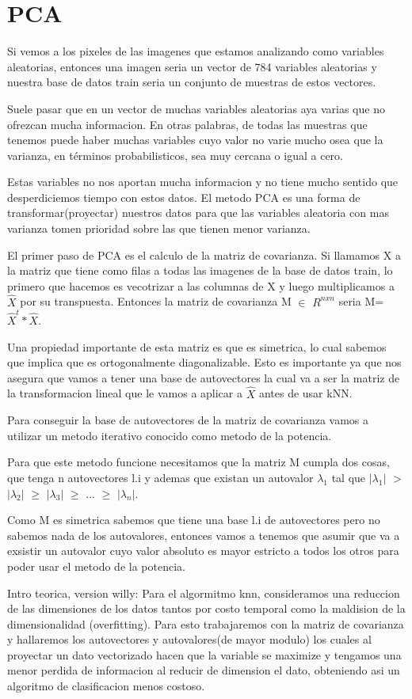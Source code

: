 \section{PCA}
Si vemos a los pixeles de las imagenes que estamos analizando como variables aleatorias, entonces una imagen seria un vector de 784 variables aleatorias y nuestra base de datos train seria un conjunto de muestras de estos vectores. \par
\indent Suele pasar que en un vector de muchas variables aleatorias aya varias que no ofrezcan mucha informacion. En otras palabras, de todas las muestras que tenemos puede haber muchas variables cuyo valor no varie mucho osea que la varianza, en términos probabilisticos, sea muy cercana o igual a cero. \par
\indent Estas variables no nos aportan mucha informacion y no tiene mucho sentido que desperdiciemos tiempo con estos datos. El metodo PCA es una forma de transformar(proyectar) nuestros datos para que las variables aleatoria con mas varianza tomen prioridad sobre las que tienen menor varianza.\par
\indent El primer paso de PCA es el calculo de la matriz de covarianza. Si llamamos X a la matriz que tiene como filas a todas las imagenes de la base de datos train, lo primero que hacemos es vecotrizar a las columnas de X y luego multiplicamos a $\hat{X}$ por su transpuesta. Entonces la matriz de covarianza M $\in$ $R^{nxn}$  seria M=$\hat{X}^{t}*\hat{X}$. \par
\indent Una propiedad importante de esta matriz es que es simetrica, lo cual sabemos que implica que es ortogonalmente diagonalizable. Esto es importante ya que nos asegura que vamos a tener una base de autovectores la cual va a ser la matriz de la transformacion lineal que le vamos a aplicar a $\hat{X}$ antes de usar kNN. \par
\indent Para conseguir la base de autovectores de la matriz de covarianza vamos a utilizar un metodo iterativo conocido como metodo de la potencia. \par
\indent Para que este metodo funcione necesitamos que la matriz M cumpla dos cosas, que tenga n autovectores l.i y ademas que existan un autovalor $\lambda_1$ tal que $|\lambda_1|$ $>$ $|\lambda_2|$ $\geq$ $|\lambda_3|$ $\geq$ ... $\geq$ $|\lambda_n|$. \par
\indent Como M es simetrica sabemos que tiene una base l.i de autovectores pero no sabemos nada de los autovalores, entonces vamos a tenemos que asumir que va a exsistir un autovalor cuyo valor absoluto es mayor estricto a todos los otros para poder usar el metodo de la potencia.\par
\break
Intro teorica, version willy:
Para el algormitmo knn, consideramos una reduccion de las dimensiones de los datos tantos por costo temporal como la maldision de la dimensionalidad (overfitting). Para esto trabajaremos con la matriz de covarianza y hallaremos los autovectores y autovalores(de mayor modulo) los cuales al proyectar un dato vectorizado hacen que la variable se maximize y tengamos una menor perdida de informacion al reducir de dimension el dato, obteniendo asi un algoritmo de clasificacion menos costoso.
